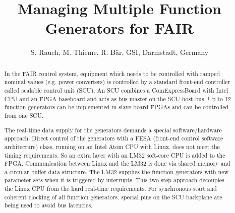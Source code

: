 \documentclass[a4paper,
              ]{jacow}
\begin{document}
\title{Managing Multiple Function Generators for FAIR}

\author{S. Rauch, M. Thieme, R. Bär, GSI,  Darmstadt, Germany}

\maketitle

%
\begin{abstract}
In the FAIR control system, equipment which needs to be controlled with ramped nominal values (e.g. power converters) is controlled by a standard front-end controller called scalable control unit (SCU). An SCU combines a ComExpressBoard with Intel CPU and an FPGA baseboard and acts as bus-master on the SCU host-bus. Up to 12 function generators can be implemented in slave-board FPGAs and can be controlled from one SCU.

The real-time data supply for the generators demands a special software/hardware approach. Direct control of the generators with a FESA (front-end control software architecture) class, running on an Intel Atom CPU with Linux, does not meet the timing requirements. So an extra layer with an LM32 soft-core CPU is added to the FPGA. Communication between Linux and the LM32 is done via shared memory and a circular buffer data structure. The LM32 supplies the function generators with new parameter sets when it is triggered by interrupts. This two-step approach decouples the Linux CPU from the hard real-time requirements. For synchronous start and coherent clocking of all function generators, special pins on the SCU backplane are being used to avoid bus latencies.\end{abstract}
\end{document}
